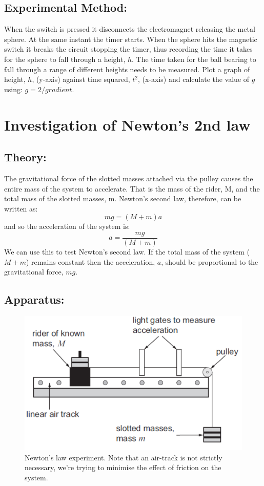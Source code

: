 \documentclass{tufte-handout}
\begin{document}
\subsection{Experimental Method:}  
When the switch is pressed it disconnects the electromagnet releasing the metal sphere. At the same instant the timer starts. When the sphere hits the magnetic switch it breaks the circuit stopping the timer, thus recording the time it takes for the sphere to fall through a height, $h$. The time taken for the ball bearing to fall through a range of different heights needs to be measured. Plot a graph of height, $h$, (y-axis) against time squared, $t^{2}$, (x-axis) and calculate the value of $g$ using:  $g = 2/gradient$. 

\section{Investigation of Newton's 2nd law}

\subsection{Theory:}  
The gravitational force of the slotted masses attached via the pulley causes the entire mass of the system to accelerate. That is the mass of the rider, M, and the total mass of the slotted masses, m. Newton’s second law, therefore, can be written as:  
\[mg=(M+m)a\]
and so the acceleration of the system is:  
\[a=\frac{mg}{(M+m)}\]  
We can use this to test Newton's second law. If the total mass of the system ($M + m$) remains constant then the acceleration, $a$, should be proportional to the gravitational force, $mg$.  
\subsection{Apparatus:}    
\begin{figure}
\includegraphics[width=\textwidth]{fma.PNG}
\caption{Newton's law experiment. Note that an air-track is not strictly necessary, we're trying to minimise the effect of friction on the system.}
\end{figure}
   
\end{document}

